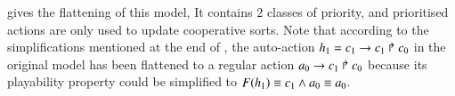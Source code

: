 \begin{table}[p]
%
  \caption{\label{tab:metazoan-php-actions}%
    The sets of actions of the metazoan segmentation model depicted
    in .
  }
\end{table}

 gives the flattening of this model,
%
It contains $2$ classes of priority, and prioritised actions are only used to update cooperative sorts.
Note that according to the simplifications mentioned at the end of ,
the auto-action $h_1 = c_1\rightarrow c_1\Rsh c_0$ in the original model has been flattened to a regular action $a_0\rightarrow c_1\Rsh c_0$
because its playability property could be simplified to $F(h_1) \equiv c_1 \wedge a_0 \equiv a_0$.

